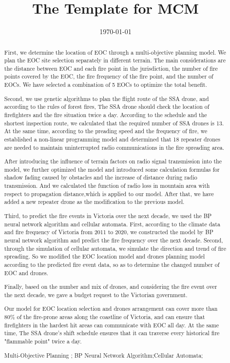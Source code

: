 \documentclass{mcmthesis}
\title{The Template for MCM}  %
\date{\today}
\begin{document}
\begin{abstract}

  First, we determine the location of EOC through a multi-objective planning model. We plan the EOC site selection separately in different terrain. The main considerations are the distance between EOC and each fire point in the jurisdiction, the number of fire points covered by the EOC, the fire frequency of the fire point, and the number of EOCs. We have selected a combination of 5 EOCs to optimize the total benefit.
    
  Second, we use genetic algorithms to plan the flight route of the SSA drone, and according to the rules of forest fires, The SSA drone should check the location of firefighters and the fire situation twice a day. According to the schedule and the shortest inspection route, we calculated that the required number of SSA drones is 13. At the same time, according to the preading speed and the frequency of fire, we established a non-linear programming model and determined that 18 repeater drones are needed to maintain uninterrupted radio communications in the fire spreading area.
      
  After introducing the influence of terrain factors on radio signal transmission into the model, we further optimized the model and introduced some calculation formulas for shadow fading caused by obstacles and the increase of distance during radio transmission. And we calculated the function of radio loss in mountain area with respect to propagation distance,which is applied to our model. After that, we have added a new repeater drone as the modification to the previous model.
      
  Third, to predict the fire events in Victoria over the next decade, we used the BP neural network algorithm and cellular automata. First, according to the climate data and fire frequency of Victoria from 2011 to 2020, we constructed the model by BP neural network algorithm and predict the fire frequency over the next decade. Second, through the simulation of cellular automata, we simulate the direction and trend of fire spreading. So we modified the EOC location model and drones planning model according to the predicted fire event data, so as to determine the changed number of EOC and drones.    
  
  Finally, based on the number and mix of drones, and considering the fire event over the next decade, we gave a budget request to the Victorian government.
      
  Our model for EOC location selection and drones arrangement can cover more than 80\% of the fire-prone areas along the coastline of Victoria, and can ensure that firefighters in the hardest hit areas can communicate with EOC all day. At the same time, The SSA drone's shift schedule ensures that it can traverse every historical fire "flammable point" twice a day.

\begin{keywords}  
Multi-Objective Planning ; BP Neural Network Algorithm;Cellular Automata;
\end{keywords}
\end{abstract}
 
\end{document}
